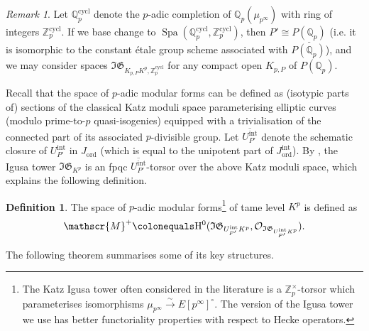 \documentclass[10pt, oneside]{amsart}
\newcommand{\defeq}{\colonequals}
\numberwithin{equation}{subsection}
\theoremstyle{definition}
\newtheorem{definition}[equation]{Definition}
\theoremstyle{remark}
\newtheorem{remark}[equation]{Remark}
\newcommand{\mbb}[1]{\mathbb{#1}}
\newcommand{\opn}[1]{\operatorname{#1}}
\def\Q{\mathbb{Q}}
\def\Z{{\mathbb{Z}}}
\begin{document}
\begin{remark} 
Let $\mbb{Q}_p^{\opn{cycl}}$ denote the $p$-adic completion of $\mbb{Q}_p(\mu_{p^{\infty}})$ with ring of integers $\mbb{Z}_p^{\opn{cycl}}$. If we base change to $\opn{Spa}(\Q_p^{\opn{cycl}}, \Z_p^{\opn{cycl}})$, then $P' \cong \underline{P(\Q_p)}$ (i.e. it is isomorphic to the constant \'{e}tale group scheme associated with $P(\mbb{Q}_p)$), and we may consider spaces $\mathfrak{IG}_{K_{p,P} K^p, \Z_p^{\opn{cycl}}}$ for any compact open $K_{p, P}$ of $P(\mbb{Q}_p)$. 
\end{remark}

Recall that the space of $p$-adic modular forms can be defined as (isotypic parts of) sections of the classical Katz moduli space parameterising elliptic curves (modulo prime-to-$p$ quasi-isogenies) equipped with a trivialisation of the connected part of its associated $p$-divisible group. Let $\overline{U_{P'}^{\opn{int}}}$ denote the schematic closure of $U_{P'}^{\opn{int}}$ in $J_{\opn{ord}}$ (which is equal to the unipotent part of $J_{\opn{ord}}^{\opn{int}}$). By \cite[Lemma 5.1.1]{howe2020unipotent}, the Igusa tower $\mathfrak{IG}_{K^p}$ is an fpqc $\overline{U_{P'}^{\opn{int}}}$-torsor over the above Katz moduli space, which explains the following definition. 

\begin{definition}
The space of $p$-adic modular forms\footnote{The Katz Igusa tower often considered in the literature is a $\mbb{Z}_p^{\times}$-torsor which parameterises isomorphisms $\mu_{p^{\infty}} \xrightarrow{\sim} E[p^\infty]^{\circ}$. The version of the Igusa tower we use has better functoriality properties with respect to Hecke operators.} of tame level $K^p$ is defined as
\[ 
\mathscr{M}^+ \defeq \mathrm{H}^0(\mathfrak{IG}_{U_{P'}^{\opn{int}} K^p}, \mathcal{O}_{{\mathfrak{IG}}_{U_{P'}^{\opn{int}}K^p}}).
\]
\end{definition}

The following theorem summarises some of its key structures.
\end{document}
